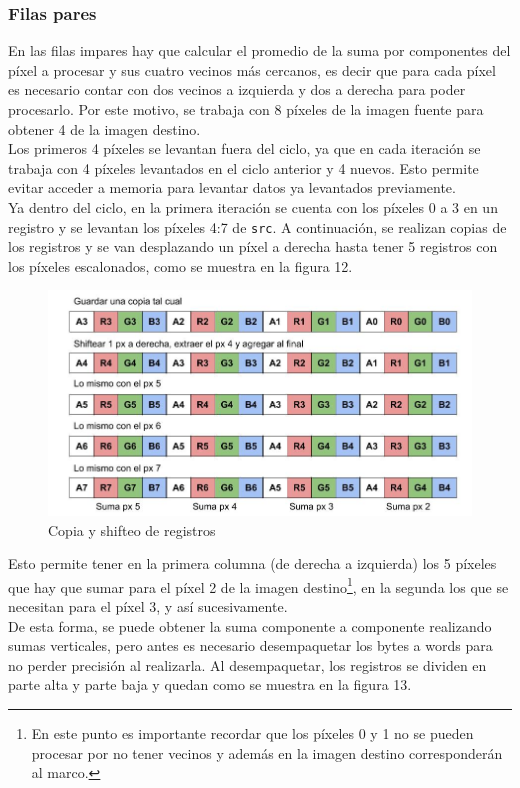 \documentclass[a4paper]{article}
\begin{document}
\subsubsection{Filas pares}
En las filas impares hay que calcular el promedio de la suma por componentes del píxel a procesar y sus cuatro vecinos más cercanos, es decir que para cada píxel es necesario contar con dos vecinos a izquierda y dos a derecha para poder procesarlo. Por este motivo, se trabaja con 8 píxeles de la imagen fuente para obtener 4 de la imagen destino. \\
Los primeros 4 píxeles se levantan fuera del ciclo, ya que en cada iteración se trabaja con 4 píxeles levantados en el ciclo anterior y 4 nuevos. Esto permite evitar acceder a memoria para levantar datos ya levantados previamente. \\
Ya dentro del ciclo, en la primera iteración se cuenta con los píxeles 0 a 3 en un registro y se levantan los píxeles 4:7 de {\tt src}.
A continuación, se realizan copias de los registros y se van desplazando un píxel a derecha hasta tener 5 registros con los píxeles escalonados, como se muestra en la figura 12.

\begin{figure}[!htb]
  \begin{center}
	\includegraphics[scale=0.4]{img/zigzag/FilasPares1.jpg}
	\caption{Copia y shifteo de registros}
  \end{center}
\end{figure}

Esto permite tener en la primera columna (de derecha a izquierda) los 5 píxeles que hay que sumar para el píxel 2 de la imagen destino\footnote{En este punto es importante recordar que los píxeles 0 y 1 no se pueden procesar por no tener vecinos y además en la imagen destino corresponderán al marco.}, en la segunda los que se necesitan para el píxel 3, y así sucesivamente. \\
De esta forma, se puede obtener la suma componente a componente realizando sumas verticales, pero antes es necesario desempaquetar los bytes a words para no perder precisión al realizarla. Al desempaquetar, los registros se dividen en parte alta y parte baja y quedan como se muestra en la figura 13.
\end{document}
